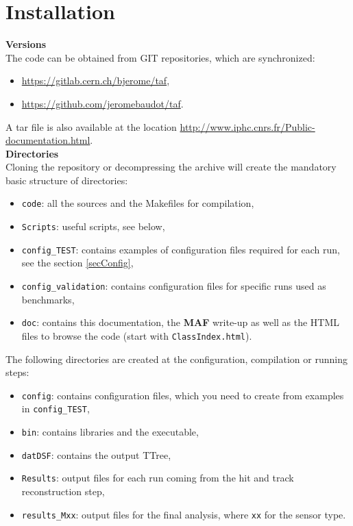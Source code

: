 \documentclass[a4paper, 12pt, twoside]{article}
\newcommand{\MAF}{{\bf MAF }}
\begin{document}
\vspace{2cm}

\section{Installation}
\label{secInstall}

\noindent
{\bf Versions}\\
\noindent
The code can be obtained from GIT repositories, which are synchronized:
\begin{itemize}
\item \url{https://gitlab.cern.ch/bjerome/taf},
\item \url{https://github.com/jeromebaudot/taf}.
\end{itemize}
A tar file is also available at the location \url{http://www.iphc.cnrs.fr/Public-documentation.html}.\\ 


\noindent
{\bf Directories}\\
\noindent
Cloning the repository or decompressing the archive will create the mandatory basic structure of directories:
\begin{itemize}
\item {\tt code}: all the sources and the Makefiles for compilation,
\item {\tt Scripts}: useful scripts, see below,
\item {\tt config\_TEST}: contains examples of configuration files required for each run, see the section \ref{secConfig},
\item {\tt config\_validation}: contains configuration files for specific runs used as benchmarks,
\item {\tt doc}: contains this documentation, the \MAF  write-up as well as the HTML files to browse the code (start with {\tt ClassIndex.html}).
\end{itemize}
The following directories are created at the configuration, compilation or running steps:
\begin{itemize}
\item {\tt config}: contains configuration files, which you need to create from examples in {\tt config\_TEST},
\item {\tt bin}: contains libraries and the executable,
\item {\tt datDSF}: contains the output TTree,
\item {\tt Results}: output files for each run coming from the hit and track reconstruction step,
\item {\tt results\_Mxx}: output files for the final analysis, where {\tt xx} for the sensor type.
\end{itemize}
\end{document}

